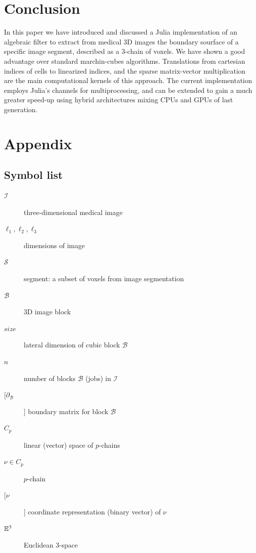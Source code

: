 \documentclass[11pt, oneside]{amsart}   	%
\begin{document}











%
\section{Conclusion}\label{sec:conclusion}

In this paper we have introduced and discussed a Julia implementation of an algebraic filter to extract from medical 3D images the boundary sourface of a specific image segment, described as a 3-chain of voxels. We have shown a good advantage over standard marchin-cubes algorithms. Translations from cartesian indices of cells to linearized indices, and the sparse matrix-vector multiplication are the main computational kernels of this approach. The current implementation employs Julia's channels for multiprocessing, and can be extended to gain a much greater speed-up using hybrid architectures mixing  CPUs and GPUs of last generation. 

\appendix
\section{Appendix}
\subsection{Symbol list}

\begin{description}
\item[$\mathcal{I}$]  three-dimensional medical image
\item[$\ell_1, \ell_2, \ell_3$]  dimensions of image
\item[$\mathcal{S}$]  segment: a subset of voxels from image segmentation
\item[$\mathcal{B}$] 3D image block
\item[$size$] lateral dimension of cubic block $\mathcal{B}$
\item[$n$]	number of blocks $\mathcal{B}$ (jobs) in $\mathcal{I}$
\item[[$\partial_\mathcal{B}$] ]  boundary matrix for block $\mathcal{B}$
\item[$C_p$] linear (vector) space of $p$-chains
\item[$\nu\in C_p$] $p$-chain
\item[[$\nu$]] coordinate representation (binary vector) of  $\nu$
\item[$\mathbb{E}^3$] Euclidean 3-space
\end{description}
\end{document}
